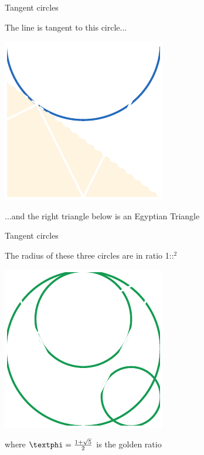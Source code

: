 \documentclass[14pt]{beamer}
\begin{document}

    \begin{frame}{Tangent circles}
        \begin{center}
            The line is tangent to this circle...
        \end{center}
        \hspace{6.18em} \includegraphics[scale=1.0]{figures/figure019e.pdf} \\
        \begin{center}
             ...and the right triangle below is an Egyptian Triangle
        \end{center}
    \end{frame}


    \begin{frame}{Tangent circles}
        \begin{center}
            The radius of these three circles are in ratio 1:\textphi:\textphi$^2$
        \end{center}\medskip
        \hspace{6.18em} \includegraphics[scale=1.0]{figures/figure019f.pdf} \\
        \begin{center}
             where $\text{\textphi} =\tfrac{1+\sqrt{5}}{2}$ is the golden ratio
        \end{center}
    \end{frame}
\end{document}
